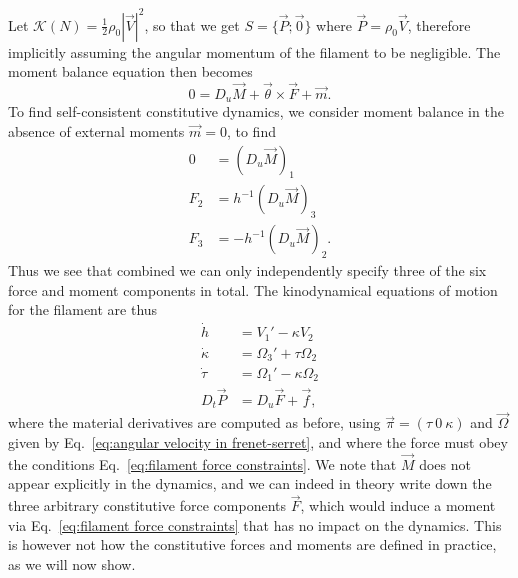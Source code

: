 Let $\mathcal{K}(N)  = \frac{1}{2} \rho_0 |\vec{V}|^2$, so that we get $S = \{ \vec{P} ; \vec{0} \}$ where $\vec{P} = \rho_0 \vec{V}$, therefore implicitly assuming the angular momentum of the filament to be negligible. The moment balance equation then becomes
\begin{equation} \label{eq:moment balance filament}
0 = D_u \vec{M} + \vec{\theta} \times \vec{F} + \vec{m}.
\end{equation}
To find self-consistent constitutive dynamics, we consider moment balance in the absence of external moments $\vec{m} = 0$, to find
\begin{subequations} \label{eq:filament force constraints}
\begin{align}
0 &  = (D_u \vec{M})_1 \\
F_2 & = h^{-1} (D_u \vec{M})_3 \\
F_3 & = - h^{-1} (D_u \vec{M})_2.
\end{align}
\end{subequations}
Thus we see that combined we can only independently specify three of the six force and moment components in total. The kinodynamical equations of motion for the filament are thus
\begin{subequations} \label{eq:filament dynamic equtions of motion}
\begin{align}
\dot{h} & = V_1' - \kappa V_2 \\
\dot{\kappa} & = \Omega_3' + \tau \Omega_2 \\
\dot{\tau} & = \Omega_1' - \kappa \Omega_2 \\
D_t \vec{P} & = D_u \vec{F} + \vec{f},
\end{align}
\end{subequations}
where the material derivatives are computed as before, using $\vec{\pi} = (\tau\ 0\ \kappa)$ and $\vec{\Omega}$ given by Eq.~\ref{eq:angular velocity in frenet-serret}, and where the force must obey the conditions Eq.~\ref{eq:filament force constraints}. We note that $\vec{M}$ does not appear explicitly in the dynamics, and we can indeed in theory write down the three arbitrary constitutive force components $\vec{F}$, which would induce a moment via Eq.~\ref{eq:filament force constraints} that has no impact on the dynamics. This is however not how the constitutive forces and moments are defined in practice, as we will now show.

